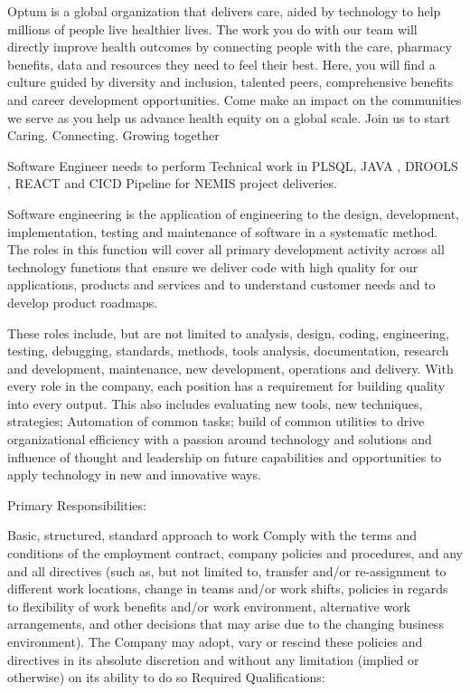Optum is a global organization that delivers care, aided by technology to help millions of people live healthier lives. The work you do with our team will directly improve health outcomes by connecting people with the care, pharmacy benefits, data and resources they need to feel their best. Here, you will find a culture guided by diversity and inclusion, talented peers, comprehensive benefits and career development opportunities. Come make an impact on the communities we serve as you help us advance health equity on a global scale. Join us to start Caring. Connecting. Growing together


Software Engineer needs to perform Technical work in PLSQL, JAVA , DROOLS , REACT and CICD Pipeline for NEMIS project deliveries.


Software engineering is the application of engineering to the design, development, implementation, testing and maintenance of software in a systematic method. The roles in this function will cover all primary development activity across all technology functions that ensure we deliver code with high quality for our applications, products and services and to understand customer needs and to develop product roadmaps.


These roles include, but are not limited to analysis, design, coding, engineering, testing, debugging, standards, methods, tools analysis, documentation, research and development, maintenance, new development, operations and delivery. With every role in the company, each position has a requirement for building quality into every output. This also includes evaluating new tools, new techniques, strategies; Automation of common tasks; build of common utilities to drive organizational efficiency with a passion around technology and solutions and influence of thought and leadership on future capabilities and opportunities to apply technology in new and innovative ways.


Primary Responsibilities:

Basic, structured, standard approach to work
Comply with the terms and conditions of the employment contract, company policies and procedures, and any and all directives (such as, but not limited to, transfer and/or re-assignment to different work locations, change in teams and/or work shifts, policies in regards to flexibility of work benefits and/or work environment, alternative work arrangements, and other decisions that may arise due to the changing business environment). The Company may adopt, vary or rescind these policies and directives in its absolute discretion and without any limitation (implied or otherwise) on its ability to do so
Required Qualifications:

